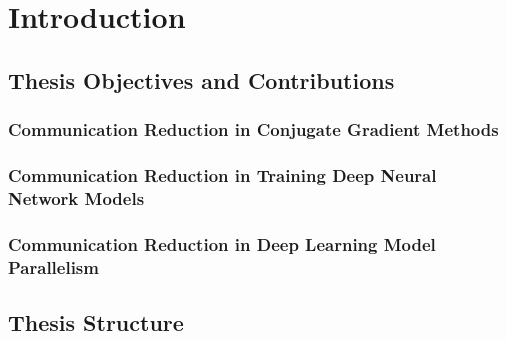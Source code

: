 
\chapter{Introduction}
\label{chap:introduction}
 
\section{Thesis Objectives and Contributions}

\subsection{Communication Reduction in Conjugate Gradient Methods}

\subsection{Communication Reduction in Training Deep Neural Network Models}

\subsection{Communication Reduction in Deep Learning Model Parallelism}


\section{Thesis Structure}

